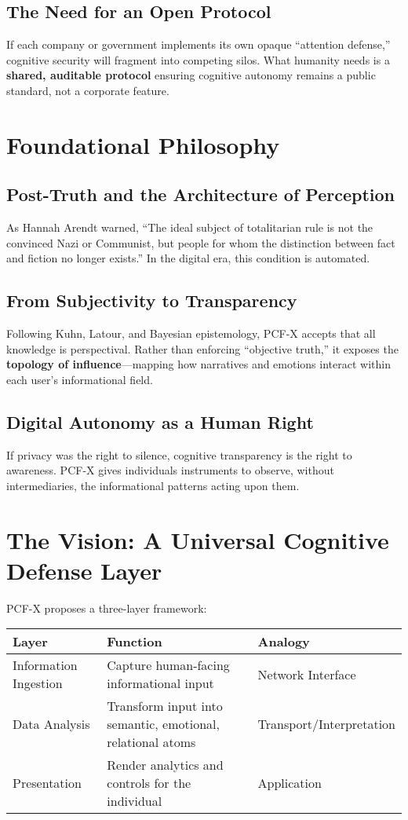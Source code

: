 \documentclass[12pt]{article}
\begin{document}
\subsection{The Need for an Open Protocol}
If each company or government implements its own opaque “attention defense,” cognitive security will fragment into competing silos.  
What humanity needs is a \textbf{shared, auditable protocol} ensuring cognitive autonomy remains a public standard, not a corporate feature.

\section{Foundational Philosophy}

\subsection{Post-Truth and the Architecture of Perception}
As Hannah Arendt warned, “The ideal subject of totalitarian rule is not the convinced Nazi or Communist, but people for whom the distinction between fact and fiction no longer exists.”  
In the digital era, this condition is automated.

\subsection{From Subjectivity to Transparency}
Following Kuhn, Latour, and Bayesian epistemology, PCF-X accepts that all knowledge is perspectival.  
Rather than enforcing “objective truth,” it exposes the \textbf{topology of influence}—mapping how narratives and emotions interact within each user’s informational field.

\subsection{Digital Autonomy as a Human Right}
If privacy was the right to silence, cognitive transparency is the right to awareness.  
PCF-X gives individuals instruments to observe, without intermediaries, the informational patterns acting upon them.

\section{The Vision: A Universal Cognitive Defense Layer}
PCF-X proposes a three-layer framework:

\begin{center}
\begin{tabular}{|l|l|l|}
\hline
\textbf{Layer} & \textbf{Function} & \textbf{Analogy}\\
\hline
Information Ingestion & Capture human-facing informational input & Network Interface\\
Data Analysis & Transform input into semantic, emotional, relational atoms & Transport/Interpretation\\
Presentation & Render analytics and controls for the individual & Application\\
\hline
\end{tabular}
\end{center}
\end{document}
